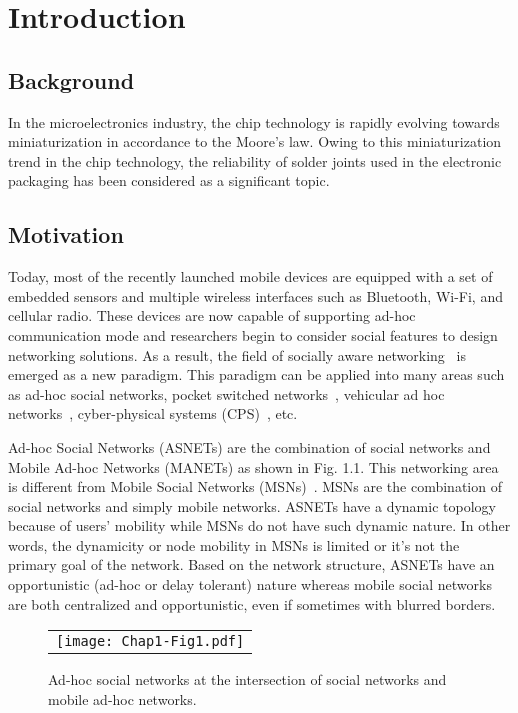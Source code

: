 \chapter{Introduction}\label{Chap1}

\section{Background}\label{Chap1_01}
In the microelectronics industry, the chip technology is rapidly evolving towards miniaturization in accordance to the Moore's law. Owing to this miniaturization trend in the chip technology, the reliability of solder joints used in the electronic packaging has been considered as a significant topic.  

\section{Motivation}\label{Chap1_01}

Today, most of the recently launched mobile devices are equipped with a set of embedded sensors and multiple wireless interfaces such as Bluetooth, Wi-Fi, and cellular radio. These devices are now capable of supporting ad-hoc communication mode and researchers begin to consider social features to design networking solutions. As a result, the field of socially aware networking~\cite{FXia2013} is emerged as a new paradigm. This paradigm can be applied into many areas such as ad-hoc social networks, pocket switched networks~\cite{SWang2012}, vehicular ad hoc networks~\cite{WChen2008}, cyber-physical systems (CPS)~\cite{FJWu2011}, etc.

Ad-hoc Social Networks (ASNETs) are the combination of social networks and Mobile Ad-hoc Networks (MANETs) as shown in Fig. 1.1. This networking area is different from Mobile Social Networks (MSNs)~\cite{NKayastha2012}. MSNs are the combination of social networks and simply mobile networks. ASNETs have a dynamic topology because of users' mobility while MSNs do not have such dynamic nature. In other words, the dynamicity or node mobility in MSNs is limited or it's not the primary goal of the network. Based on the network structure, ASNETs have an opportunistic (ad-hoc or delay tolerant) nature whereas mobile social networks are both centralized and opportunistic, even if sometimes with blurred borders.
\begin{figure}[b]
\begin{center}
  \begin{tabular}{c}
  \texttt{[image: Chap1-Fig1.pdf]}
  \end{tabular}
  \caption{Ad-hoc social networks at the intersection of social networks and mobile ad-hoc networks.}
\end{center}
\end{figure}

